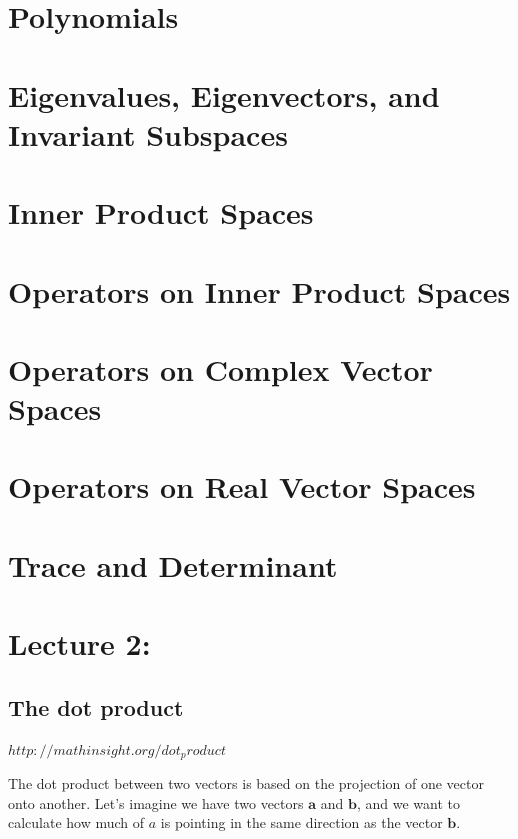 \documentclass{report}
\begin{document}
\chapter{Polynomials}

\chapter{Eigenvalues, Eigenvectors, and Invariant Subspaces}

\chapter{Inner Product Spaces}

\chapter{Operators on Inner Product Spaces}

\chapter{Operators on Complex Vector Spaces}

\chapter{Operators on Real Vector Spaces}

\chapter{Trace and Determinant}

\chapter{Lecture 2: }

\section{The dot product}
$http://mathinsight.org/dot_product$\newline

The dot product between two vectors is based on the projection of one vector onto another. Let's imagine we have two vectors $\bm{a}$ and $\bm{b}$, and we want to calculate how much of $a$ is pointing in the same direction as the vector $\bm{b}$.\newline\newline
\end{document}
